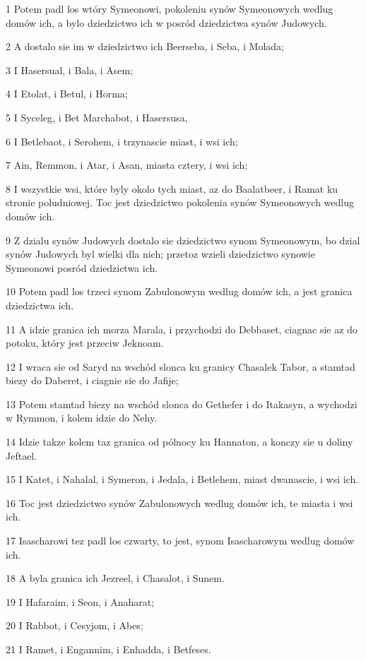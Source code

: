 \par 1 Potem padl los wtóry Symeonowi, pokoleniu synów Symeonowych wedlug domów ich, a bylo dziedzictwo ich w posród dziedzictwa synów Judowych.
\par 2 A dostalo sie im w dziedzictwo ich Beerseba, i Seba, i Molada;
\par 3 I Hasersual, i Bala, i Asem;
\par 4 I Etolat, i Betul, i Horma;
\par 5 I Syceleg, i Bet Marchabot, i Hasersusa,
\par 6 I Betlebaot, i Serohem, i trzynascie miast, i wsi ich;
\par 7 Ain, Remmon, i Atar, i Asan, miasta cztery, i wsi ich;
\par 8 I wszystkie wsi, które byly okolo tych miast, az do Baalatbeer, i Ramat ku stronie poludniowej. Toc jest dziedzictwo pokolenia synów Symeonowych wedlug domów ich.
\par 9 Z dzialu synów Judowych dostalo sie dziedzictwo synom Symeonowym, bo dzial synów Judowych byl wielki dla nich; przetoz wzieli dziedzictwo synowie Symeonowi posród dziedzictwa ich.
\par 10 Potem padl los trzeci synom Zabulonowym wedlug domów ich, a jest granica dziedzictwa ich.
\par 11 A idzie granica ich morza Marala, i przychodzi do Debbaset, ciagnac sie az do potoku, który jest przeciw Jeknoam.
\par 12 I wraca sie od Saryd na wschód slonca ku granicy Chasalek Tabor, a stamtad biezy do Daberet, i ciagnie sie do Jafije;
\par 13 Potem stamtad biezy na wschód slonca do Gethefer i do Itakasyn, a wychodzi w Rymmon, i kolem idzie do Nehy.
\par 14 Idzie takze kolem taz granica od pólnocy ku Hannaton, a konczy sie u doliny Jeftael.
\par 15 I Katet, i Nahalal, i Symeron, i Jedala, i Betlehem, miast dwanascie, i wsi ich.
\par 16 Toc jest dziedzictwo synów Zabulonowych wedlug domów ich, te miasta i wsi ich.
\par 17 Isascharowi tez padl los czwarty, to jest, synom Isascharowym wedlug domów ich.
\par 18 A byla granica ich Jezreel, i Chasalot, i Sunem.
\par 19 I Hafaraim, i Seon, i Anaharat;
\par 20 I Rabbot, i Cesyjom, i Abes;
\par 21 I Ramet, i Engannim, i Enhadda, i Betfeses.
